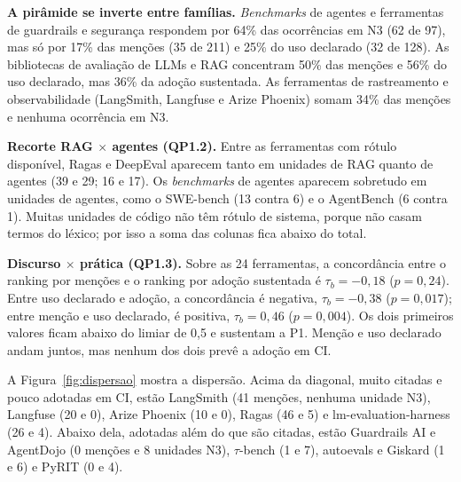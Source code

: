 \documentclass[sigconf]{acmart}
\begin{document}
\textbf{A pirâmide se inverte entre famílias.} \textit{Benchmarks} de agentes e ferramentas de guardrails e segurança respondem por 64\% das ocorrências em N3 (62 de 97), mas só por 17\% das menções (35 de 211) e 25\% do uso declarado (32 de 128). As bibliotecas de avaliação de LLMs e RAG concentram 50\% das menções e 56\% do uso declarado, mas 36\% da adoção sustentada. As ferramentas de rastreamento e observabilidade (LangSmith, Langfuse e Arize Phoenix) somam 34\% das menções e nenhuma ocorrência em N3.

\textbf{Recorte RAG $\times$ agentes (QP1.2).} Entre as ferramentas com rótulo disponível, Ragas e DeepEval aparecem tanto em unidades de RAG quanto de agentes (39 e 29; 16 e 17). Os \textit{benchmarks} de agentes aparecem sobretudo em unidades de agentes, como o SWE-bench (13 contra 6) e o AgentBench (6 contra 1). Muitas unidades de código não têm rótulo de sistema, porque não casam termos do léxico; por isso a soma das colunas fica abaixo do total.

\textbf{Discurso $\times$ prática (QP1.3).} Sobre as 24 ferramentas, a concordância entre o ranking por menções e o ranking por adoção sustentada é $\tau_b = -0{,}18$ ($p = 0{,}24$). Entre uso declarado e adoção, a concordância é negativa, $\tau_b = -0{,}38$ ($p = 0{,}017$); entre menção e uso declarado, é positiva, $\tau_b = 0{,}46$ ($p = 0{,}004$). Os dois primeiros valores ficam abaixo do limiar de 0,5 e sustentam a P1. Menção e uso declarado andam juntos, mas nenhum dos dois prevê a adoção em CI.

A Figura~\ref{fig:dispersao} mostra a dispersão. Acima da diagonal, muito citadas e pouco adotadas em CI, estão LangSmith (41 menções, nenhuma unidade N3), Langfuse (20 e 0), Arize Phoenix (10 e 0), Ragas (46 e 5) e lm-evaluation-harness (26 e 4). Abaixo dela, adotadas além do que são citadas, estão Guardrails AI e AgentDojo (0 menções e 8 unidades N3), $\tau$-bench (1 e 7), autoevals e Giskard (1 e 6) e PyRIT (0 e 4).
\end{document}
